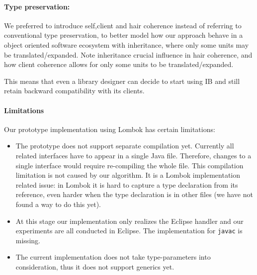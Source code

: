 \paragraph{Type preservation:}
We preferred to introduce self,client and hair coherence instead of referring to conventional
type preservation,
to better model how our approach behave in a object oriented software ecosystem with inheritance,
where only some units may be translated/expanded.
Note inheritance crucial influence in hair coherence, and how client coherence allows
for only some units to be translated/expanded.

This means that even a library designer can decide to start using IB and still
retain backward compatibility with its clients.





\paragraph{Limitations}
Our prototype implementation using Lombok has certain limitations:
\begin{itemize}
\item The prototype does not support separate compilation yet. Currently all
  related interfaces have to appear in a single Java file. Therefore, changes to
  a single interface would require re-compiling the whole file. This compilation
  limitation is not caused by our algorithm. It is a Lombok implementation related
  issue: in Lombok it is hard to capture a type declaration from its reference,
  even harder when the type declaration is in other files (we have not found a
  way to do this yet).
\item At this stage our implementation only realizes the Eclipse handler and our
  experiments are all conducted in Eclipse. The implementation for
  \texttt{javac} is missing.
\item The current implementation does not take type-parameters into
  consideration, thus it does not support generics yet.
\end{itemize}

